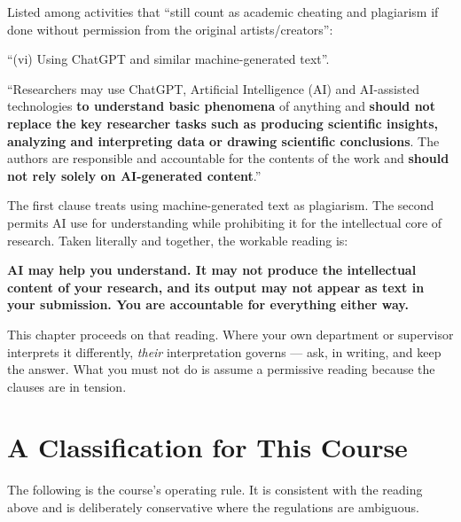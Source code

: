 \begin{regbox}
Listed among activities that ``still count as academic cheating and plagiarism
if done without permission from the original artists/creators'':

\medskip
``(vi) Using ChatGPT and similar machine-generated text''.
\end{regbox}

\begin{regbox}
``Researchers may use ChatGPT, Artificial Intelligence (AI) and AI-assisted
technologies \textbf{to understand basic phenomena} of anything and
\textbf{should not replace the key researcher tasks such as producing
scientific insights, analyzing and interpreting data or drawing scientific
conclusions}. The authors are responsible and accountable for the contents of
the work and \textbf{should not rely solely on AI-generated content}.''
\end{regbox}

\begin{alertbox}
The first clause treats using machine-generated text as plagiarism. The second
permits AI use for understanding while prohibiting it for the intellectual core
of research. Taken literally and together, the workable reading is:

\medskip
\textbf{AI may help you understand. It may not produce the intellectual content
of your research, and its output may not appear as text in your submission. You
are accountable for everything either way.}

\medskip
This chapter proceeds on that reading. Where your own department or supervisor
interprets it differently, \emph{their} interpretation governs --- ask, in
writing, and keep the answer. What you must not do is assume a permissive
reading because the clauses are in tension.
\end{alertbox}

\section{A Classification for This Course}

The following is the course's operating rule. It is consistent with the reading
above and is deliberately conservative where the regulations are ambiguous.


